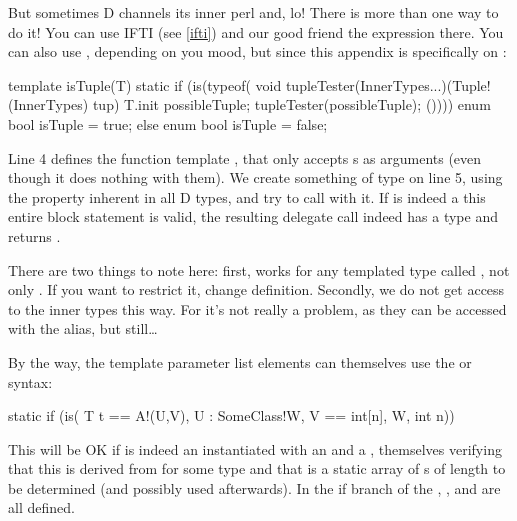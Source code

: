 But sometimes D channels its inner perl and, lo! There is more than one way to do it! You can use IFTI (see \ref{ifti}) and our good friend the \DD{(} expression there. You can also use , depending on you mood, but since this appendix is specifically on :

\begin{dcode}
template isTuple(T)
{
    static if (is(typeof({
              void tupleTester(InnerTypes...)(Tuple!(InnerTypes) tup) {}
              T.init possibleTuple;
              tupleTester(possibleTuple);
              }())))
        enum bool isTuple = true;
    else
        enum bool isTuple = false;
}
\end{dcode}

Line 4 defines the function template , that only accepts s as arguments (even though it does nothing with them). We create something of type  on line 5, using the  property inherent in all D types, and try to call  with it. If  is indeed a  this entire block statement is valid, the resulting delegate call indeed has a type and  returns .

There are two things to note here: first,  works for any templated type called , not only . If you want to restrict it, change  definition. Secondly, we do not get access to the inner types this way. For  it's not really a problem, as they can be accessed with the  alias, but still\ldots

By the way, the template parameter list elements can themselves use the  or  syntax:

\begin{dcode}
static if (is( T t == A!(U,V), U : SomeClass!W, V == int[n], W, int n))
\end{dcode}

This will be OK if  is indeed an  instantiated with an  and a , themselves verifying that this  is derived from  for some  type and that  is a static array of s of length  to be determined (and possibly used afterwards). In the if branch of the  , ,  and  are all defined. 

